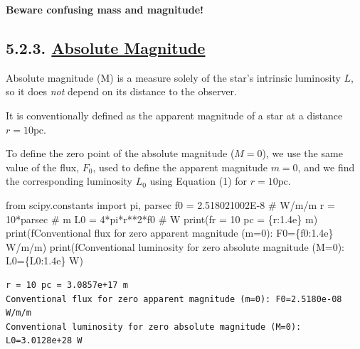 \documentclass[
  letterpaper,
  DIV=11,
  numbers=noendperiod]{scrreprt}
\newenvironment{Shaded}{\begin{snugshade}}{\end{snugshade}}
\newcommand{\BuiltInTok}[1]{\textcolor[rgb]{0.00,0.23,0.31}{#1}}
\newcommand{\CommentTok}[1]{\textcolor[rgb]{0.37,0.37,0.37}{#1}}
\newcommand{\DecValTok}[1]{\textcolor[rgb]{0.68,0.00,0.00}{#1}}
\newcommand{\FloatTok}[1]{\textcolor[rgb]{0.68,0.00,0.00}{#1}}
\newcommand{\ImportTok}[1]{\textcolor[rgb]{0.00,0.46,0.62}{#1}}
\newcommand{\NormalTok}[1]{\textcolor[rgb]{0.00,0.23,0.31}{#1}}
\newcommand{\OperatorTok}[1]{\textcolor[rgb]{0.37,0.37,0.37}{#1}}
\newcommand{\SpecialCharTok}[1]{\textcolor[rgb]{0.37,0.37,0.37}{#1}}
\newcommand{\SpecialStringTok}[1]{\textcolor[rgb]{0.13,0.47,0.30}{#1}}
\begin{document}
\textbf{Beware confusing mass and magnitude!}

\hypertarget{absolute-magnitude}{%
\subsection{\texorpdfstring{5.2.3. \protect\hyperlink{toc0_}{Absolute
Magnitude}}{5.2.3. Absolute Magnitude}}\label{absolute-magnitude}}

Absolute magnitude (M) is a measure solely of the star's intrinsic
luminosity \(L\), so it does \emph{not} depend on its distance to the
observer.

It is conventionally defined as the apparent magnitude of a star at a
distance \(r=10\mathrm{pc}\).

To define the zero point of the absolute magnitude (\(M=0\)), we use the
same value of the flux, \(F_0\), used to define the apparent magnitude
\(m=0\), and we find the corresponding luminosity \(L_0\) using Equation
(1) for \(r=10\mathrm{pc}\).

\begin{Shaded}
\begin{Highlighting}[]
\ImportTok{from}\NormalTok{ scipy.constants }\ImportTok{import}\NormalTok{ pi, parsec}
\NormalTok{f0 }\OperatorTok{=} \FloatTok{2.518021002E{-}8} \CommentTok{\# W/m/m}
\NormalTok{r }\OperatorTok{=} \DecValTok{10}\OperatorTok{*}\NormalTok{parsec }\CommentTok{\# m}
\NormalTok{L0 }\OperatorTok{=} \DecValTok{4}\OperatorTok{*}\NormalTok{pi}\OperatorTok{*}\NormalTok{r}\OperatorTok{**}\DecValTok{2}\OperatorTok{*}\NormalTok{f0 }\CommentTok{\# W}
\BuiltInTok{print}\NormalTok{(}\SpecialStringTok{f\textquotesingle{}r = 10 pc = }\SpecialCharTok{\{}\NormalTok{r}\SpecialCharTok{:1.4e\}}\SpecialStringTok{ m\textquotesingle{}}\NormalTok{)}
\BuiltInTok{print}\NormalTok{(}\SpecialStringTok{f\textquotesingle{}Conventional flux for zero apparent magnitude (m=0): F0=}\SpecialCharTok{\{}\NormalTok{f0}\SpecialCharTok{:1.4e\}}\SpecialStringTok{ W/m/m\textquotesingle{}}\NormalTok{)}
\BuiltInTok{print}\NormalTok{(}\SpecialStringTok{f\textquotesingle{}Conventional luminosity for zero absolute magnitude (M=0): L0=}\SpecialCharTok{\{}\NormalTok{L0}\SpecialCharTok{:1.4e\}}\SpecialStringTok{ W\textquotesingle{}}\NormalTok{)}
\end{Highlighting}
\end{Shaded}

\begin{verbatim}
r = 10 pc = 3.0857e+17 m
Conventional flux for zero apparent magnitude (m=0): F0=2.5180e-08 W/m/m
Conventional luminosity for zero absolute magnitude (M=0): L0=3.0128e+28 W
\end{verbatim}
\end{document}
